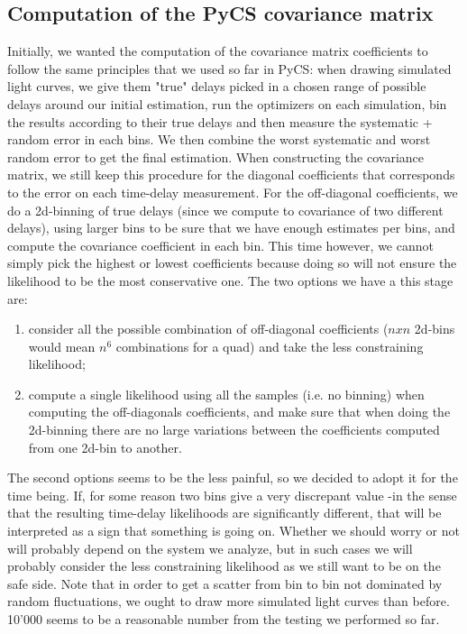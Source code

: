 \documentclass[11pt]{scrartcl}
\begin{document}
\subsection*{Computation of the PyCS covariance matrix}

Initially, we wanted the computation of the covariance matrix 
coefficients to follow the same 
principles that we used so far in PyCS: when drawing simulated light 
curves, we give them "true" delays 
picked in a chosen range of possible delays around our initial 
estimation, run the optimizers on each 
simulation, bin the results according to their true delays and then 
measure the systematic + random error in each bins. We then combine the 
worst systematic and worst random error to get the final estimation. 
When constructing the covariance matrix, we still keep this 
procedure for the 
diagonal coefficients that corresponds to the error on each time-delay 
measurement. For the off-diagonal coefficients, we do a 2d-binning of 
true delays
(since we compute to covariance of two different delays), using larger 
bins to be 
sure that we have enough estimates per bins, and compute the covariance 
coefficient in each bin. This time however, we cannot simply pick the 
highest or lowest coefficients because 
doing so will not ensure the likelihood to be the most conservative 
one. The two options we have a this stage are:

\begin{enumerate}
\item consider all the possible combination of off-diagonal 
coefficients ($nxn$ 2d-bins would mean $n^6$ combinations for a quad) 
and take the less constraining likelihood; 

\item compute a single likelihood using all the samples (i.e. no 
binning) when computing the off-diagonals coefficients, and make sure 
that when doing the 2d-binning there are no large variations between the 
coefficients computed from one 2d-bin to another. 
\end{enumerate}

The second options seems to be the less painful, so we decided to adopt 
it for the time being. If, for some reason two bins give a very 
discrepant value -in the sense that the 
resulting time-delay likelihoods are significantly different, that 
will 
be interpreted as a sign that something is going on. Whether we should 
worry or not will probably depend on the system we analyze, but in such 
cases we will probably consider the less constraining likelihood as we 
still want to be on the safe side. 
Note that in order to get a scatter from bin to bin not dominated by 
random fluctuations, we ought to draw more simulated light curves than 
before. 10'000 seems to be a reasonable number from the testing we 
performed so far.\\
\end{document}
